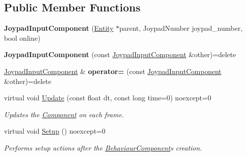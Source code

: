 \subsection*{Public Member Functions}
\begin{DoxyCompactItemize}
\item 
\mbox{\label{class_blade_1_1_joypad_input_component_a69c169898e9f45399da66f9d912da2cf}} 
{\bfseries Joypad\+Input\+Component} (\hyperlink{class_blade_1_1_entity}{Entity} $\ast$parent, Joypad\+Number joypad\+\_\+number, bool online)
\item 
\mbox{\label{class_blade_1_1_joypad_input_component_a683bd84cfddc9c0427d673b209feb3a5}} 
{\bfseries Joypad\+Input\+Component} (const \hyperlink{class_blade_1_1_joypad_input_component}{Joypad\+Input\+Component} \&other)=delete
\item 
\mbox{\label{class_blade_1_1_joypad_input_component_a50da9013022078ae5d73a25b3149aad3}} 
\hyperlink{class_blade_1_1_joypad_input_component}{Joypad\+Input\+Component} \& {\bfseries operator=} (const \hyperlink{class_blade_1_1_joypad_input_component}{Joypad\+Input\+Component} \&other)=delete
\item 
virtual void \hyperlink{class_blade_1_1_joypad_input_component_a386bea7c84d17eefa0d40bfa17575e04}{Update} (const float dt, const long time=0) noexcept=0
\begin{DoxyCompactList}\small\item\em Updates the \hyperlink{class_blade_1_1_component}{Component} on each frame. \end{DoxyCompactList}\item 
\mbox{\label{class_blade_1_1_joypad_input_component_a06b676433645ed509e516061f90589c2}} 
virtual void \hyperlink{class_blade_1_1_joypad_input_component_a06b676433645ed509e516061f90589c2}{Setup} () noexcept=0
\begin{DoxyCompactList}\small\item\em Performs setup actions after the \hyperlink{class_blade_1_1_behaviour_component}{Behaviour\+Component}\textquotesingle{}s creation. \end{DoxyCompactList}\item 
\mbox{\label{class_blade_1_1_joypad_input_component_ab5009626ea7dd18b3713b4e3ee8fa650}} 

\end{DoxyCompactItemize}
